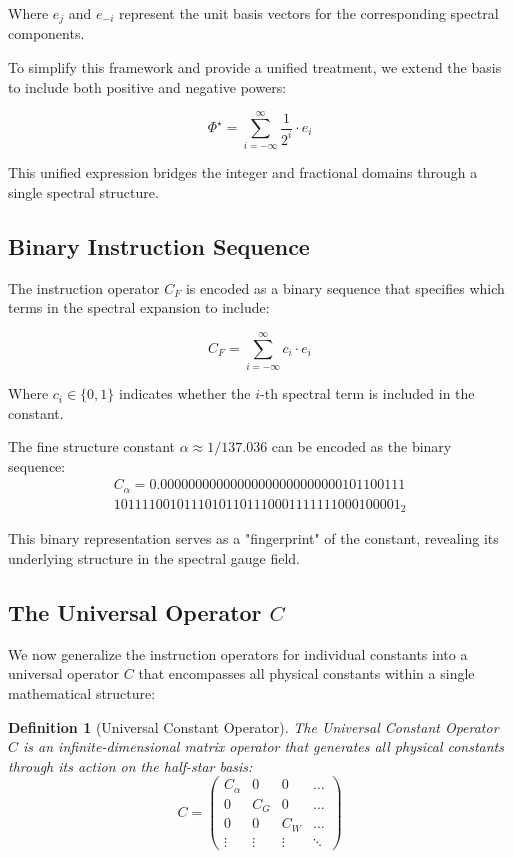 \documentclass{article}
\newtheorem{definition}{Definition}
\begin{document}
Where $e_j$ and $e_{-i}$ represent the unit basis vectors for the corresponding spectral components.

To simplify this framework and provide a unified treatment, we extend the basis to include both positive and negative powers:

\begin{equation}
\Phi^\star = \sum_{i=-\infty}^{\infty} \frac{1}{2^i} \cdot e_i
\end{equation}

This unified expression bridges the integer and fractional domains through a single spectral structure.

\subsection{Binary Instruction Sequence}

The instruction operator $C_F$ is encoded as a binary sequence that specifies which terms in the spectral expansion to include:

\begin{equation}
C_F = \sum_{i=-\infty}^{\infty} c_i \cdot e_i
\end{equation}

Where $c_i \in \{0, 1\}$ indicates whether the $i$-th spectral term is included in the constant.

\begin{example}
The fine structure constant $\alpha \approx 1/137.036$ can be encoded as the binary sequence:
\begin{multline}
C_\alpha = 0.00000000000000000000000000101100111\\
10111100101110101101110001111111000100001_2
\end{multline}

This binary representation serves as a "fingerprint" of the constant, revealing its underlying structure in the spectral gauge field.
\end{example}

\subsection{The Universal Operator $C$}

We now generalize the instruction operators for individual constants into a universal operator $C$ that encompasses all physical constants within a single mathematical structure:

\begin{definition}[Universal Constant Operator]
The Universal Constant Operator $C$ is an infinite-dimensional matrix operator that generates all physical constants through its action on the half-star basis:
\begin{equation}
C = \begin{pmatrix}
C_\alpha & 0 & 0 & \ldots \\
0 & C_G & 0 & \ldots \\
0 & 0 & C_W & \ldots \\
\vdots & \vdots & \vdots & \ddots
\end{pmatrix}
\end{equation}
\end{definition}
\end{document}
